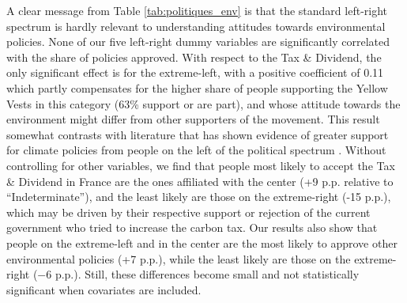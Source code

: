 \documentclass[english,5p,authoryear]{elsarticle}
\begin{document}

A clear message from Table \ref{tab:politiques_env} is that the standard left-right spectrum is hardly relevant to understanding attitudes towards environmental policies. None of our five left-right dummy variables are significantly correlated with the share of policies approved. With respect to the Tax \& Dividend, the only significant effect is for the extreme-left, with a positive coefficient of 0.11 which partly compensates for the higher share of people supporting the Yellow Vests in this category (63\% support or are part), and whose attitude towards the environment might differ from other supporters of the movement. This result somewhat contrasts with literature that has shown evidence of greater support for climate policies from people on the left of the political spectrum \citep[see][for a review]{drews_van_der_bergh_2016}. Without controlling for other variables, we find that people most likely to accept the Tax \& Dividend in France are the ones affiliated with the center (+9 p.p. relative to ``Indeterminate''), and the least likely are those on the extreme-right (-15 p.p.), which may be driven by their respective support or rejection of the current government who tried to increase the carbon tax. Our results also show that people on the extreme-left and in the center are the most likely to approve other environmental policies (+7 p.p.), while the least likely are those on the extreme-right ($-$6 p.p.). Still, these differences become small and not statistically significant when covariates are included.

\end{document}
